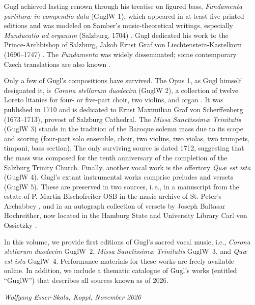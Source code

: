 \documentclass[abbrwidth=7em,shorttitlesize=55]{ees}
\begin{document}
Gugl achieved lasting renown through his treatise on figured bass, \textit{Fundamenta partituræ in compendio data} (GuglW 1), which appeared in at least five printed editions and was modeled on Samber's music-theoretical writings, especially \textit{Manducatio ad organum} (Salzburg, 1704) \parencite{Federhofer1964,Kohlschütter1979,Fuchs2021}. Gugl dedicated his work to the Prince-Archbishop of Salzburg, Jakob Ernst Graf von Liechtenstein-Kastelkorn (1690–1747) \parencite{Sehnal2018}. The \textit{Fundamenta} was widely disseminated; some contemporary Czech translations are also known \parencite{Pulkert2014,Prendl2015,Ludvova1985,Kacic2018,Sehnal1982}.

Only a few of Gugl's compositions have survived. The Opus 1, as Gugl himself designated it, is \textit{Corona stellarum duodecim} (GuglW 2), a collection of twelve Loreto litanies for four- or five-part choir, two violins, and organ \parencite{FederhoferKönigs1996}. It was published in 1710 and is dedicated to Ernst Maximilian Graf von Scherffenberg (1673–1713), provost of Salzburg Cathedral. The \textit{Missa Sanctissimæ Trinitatis} (GuglW 3) stands in the tradition of the Baroque solemn mass due to its scope and scoring (four-part solo ensemble, choir, two violins, two violas, two trumpets, timpani, bass section). The only surviving source is dated 1712, suggesting that the mass was composed for the tenth anniversary of the completion of the Salzburg Trinity Church. Finally, another vocal work is the offertory \textit{Quæ est ista} (GuglW 4). Gugl's extant instrumental works comprise preludes and versets (GuglW 5). These are preserved in two sources, i.\,e., in a manuscript from the estate of P. Martin Bischofreiter OSB in the music archive of St. Peter's Archabbey \parencite{Pagitsch2005,Eder2019}, and in an autograph collection of versets by Joseph Baltasar Hochreither, now located in the Hamburg State and University Library Carl von Ossietzky \parencite{EsserSkala2026}.

In this volume, we provide first editions of Gugl's sacred vocal music, i.e., \textit{Corona stellarum duodecim} GuglW~2, \textit{Missa Sanctissimæ Trinitatis} GuglW~3, and \textit{Quæ est ista} GuglW~4. Performance materials for these works are freely available online. In addition, we include a thematic catalogue of Gugl's works (entitled “GuglW”) that describes all sources known as of 2026.

\textit{Wolfgang Esser-Skala, Koppl, November 2026}

\clearpage
\printbibliography[heading=subbibintoc]
\end{document}
